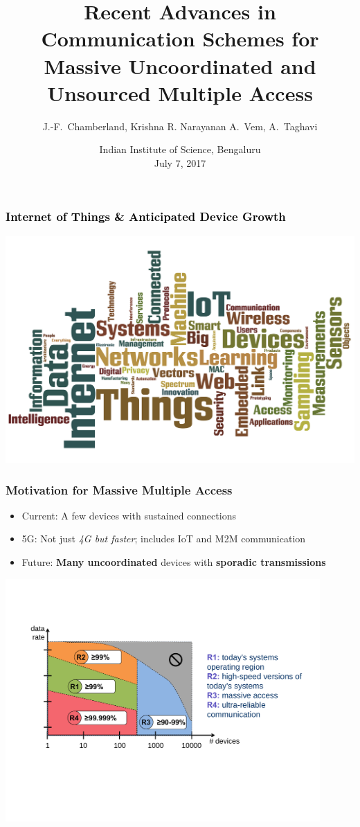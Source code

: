 \documentclass[10pt]{beamer}
\title{Recent Advances in Communication Schemes for Massive Uncoordinated and Unsourced Multiple Access}
\author{J.-F.~Chamberland, Krishna R. Narayanan A.~Vem, A.~Taghavi}
\institute{Electrical and Computer Engineering \\ Texas A\&M University}
\date{Indian Institute of Science, Bengaluru \\ July 7, 2017}
\begin{document}
\begin{frame}
  \titlepage

\end{frame}


\begin{frame}
\frametitle{\textcolor{black}{Internet of Things \& Anticipated Device Growth}}
\begin{center}
\includegraphics[width=1.0\textwidth]{Figures/Wordle.png}
\end{center}
\end{frame}


\begin{frame}
\frametitle{Motivation for Massive Multiple Access}
\begin{itemize}
\item Current: A few devices with sustained connections
\item 5G: Not just \emph{4G but faster}; includes IoT and M2M communication
\item Future: \textbf{Many uncoordinated} devices with \textbf{sporadic transmissions}
\end{itemize}
\begin{center}
\includegraphics[width=0.9\textwidth]{Figures/5Gchanginglandscape.pdf}
\end{center}
\end{frame}
\end{document}
